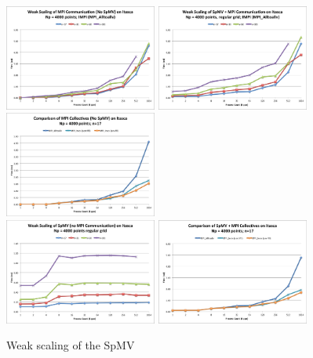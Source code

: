 \documentclass{report}
\begin{document}
\begin{figure}
\centering
\includegraphics[width=5cm]{performance_content/scaling/weak_scaling_np4000_regular_alltoallv_commOnly.png}
\includegraphics[width=5cm]{performance_content/scaling/weak_scaling_np4000_regular_alltoallv.png}  
\includegraphics[width=5cm]{performance_content/scaling/weak_scaling_np4000_regular_n17_compare_commOnly.png} \\
\includegraphics[width=5cm]{performance_content/scaling/weak_scaling_np4000_regular_spmvOnly.png} 
\includegraphics[width=5cm]{performance_content/scaling/weak_scaling_np4000_regular_n17_compare.png}
\caption{Weak scaling of the SpMV}
\end{figure}
\end{document}
